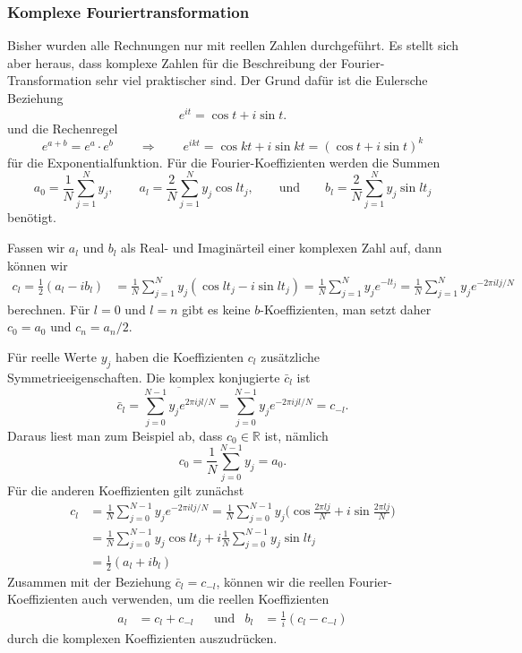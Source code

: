 %
%
%
\subsubsection{Komplexe Fouriertransformation}
Bisher wurden alle Rechnungen nur mit reellen Zahlen durchgeführt.
Es stellt sich aber heraus, dass komplexe Zahlen für die Beschreibung
der Fourier-Transformation sehr viel praktischer sind.
Der Grund dafür ist die Eulersche Beziehung
\[
e^{it} = \cos t + i \sin t.
\]
und die Rechenregel
\[
e^{a+b}=e^a\cdot e^b
\qquad\Rightarrow\qquad
e^{ikt}=\cos kt+i\sin kt = (\cos t + i \sin t)^k
\]
für die Exponentialfunktion.
Für die Fourier-Koeffizienten werden die Summen
\[
a_0
=
\frac{1}{N}\sum_{j=1}^N y_j,\qquad
a_l
=
\frac{2}{N}\sum_{j=1}^N y_j \cos lt_j,
\qquad\text{und}\qquad
b_l
=
\frac{2}{N}\sum_{j=1}^N y_j \sin lt_j
\]
benötigt.

Fassen wir $a_l$ und $b_l$ als Real- und Imaginärteil einer komplexen
Zahl auf, dann können wir 
\begin{align*}
c_l
=
\frac12(a_l-ib_l)
&=
\frac{1}{N} \sum_{j=1}^N y_j (\cos lt_j - i \sin lt_j)
=
\frac1{N} \sum_{j=1}^N y_j e^{-lt_j}
=
\frac{1}{N} \sum_{j=1}^N y_j e^{-2\pi ilj/N}
\label{skript:complex:cl}
\end{align*}
berechnen.
Für $l=0$ und $l=n$ gibt es keine $b$-Koeffizienten, man setzt daher
$c_0 = a_0$ und $c_n=a_n/2$.

Für reelle Werte $y_j$ haben die Koeffizienten $c_l$ zusätzliche
Symmetrieeigenschaften.
Die komplex konjugierte $\bar c_l$ ist
\[
\bar c_l
=
\overline{\sum_{j=0}^{N-1} y_j e^{2\pi ijl/N}}
=
\sum_{j=0}^{N-1} y_j e^{-2\pi i jl/N}
=
c_{-l}.
\]
Daraus liest man zum Beispiel ab, dass $c_0\in\mathbb R$ ist, nämlich
\[
c_0 = \frac{1}{N} \sum_{j=0}^{N-1} y_j = a_0.
\]
Für die anderen Koeffizienten gilt zunächst
\begin{align*}
c_l
&=
\frac{1}{N}\sum_{j=0}^{N-1} y_j e^{-2\pi ilj/N}
=
\frac{1}{N}\sum_{j=0}^{N-1} y_j \biggl(\cos \frac{2\pi lj}{N} + i \sin\frac{2\pi lj}{N}\biggr)
\\
&=
\frac{1}{N}\sum_{j=0}^{N-1} y_j
\cos lt_j
+
i
\frac{1}{N}\sum_{j=0}^{N-1} y_j
\sin lt_j
\\
&=
\frac12(a_l + ib_l)
\end{align*}
Zusammen mit der Beziehung $\bar c_l=c_{-l}$, können wir die reellen
Fourier-Koeffizienten auch verwenden, um die reellen Koeffizienten
\begin{align*}
a_l
&=
c_l + c_{-l}
&&\text{und}&
b_l
&=
\frac1{i}
(c_l - c_{-l})
\end{align*}
durch die komplexen Koeffizienten auszudrücken.

